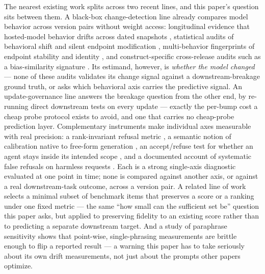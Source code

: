 \documentclass[11pt]{article}
\begin{document}
The nearest existing work splits across two recent lines, and this paper's question sits between them. A black-box change-detection line already compares model behavior across version pairs without weight access: longitudinal evidence that hosted-model behavior drifts across dated snapshots \citep{ChenDrift2307}, statistical audits of behavioral shift and silent endpoint modification \citep{AuditBehaviorShift2410,YouveChanged2504,RankUniformity2506,ModelEquality2410,LogProbTracking2512,ModelSubstitution2504}, multi-behavior fingerprints of endpoint stability and identity \citep{BehavioralFingerprints2603}, and construct-specific cross-release audits such as a bias-similarity signature \citep{BiasSimBSM2607}. Its estimand, however, is \emph{whether the model changed} --- none of these audits validates its change signal against a downstream-breakage ground truth, or asks which behavioral axis carries the predictive signal. An update-governance line answers the breakage question from the other end, by re-running direct downstream tests on every update \citep{TestBeforeDeploy2604,SkillDriftContract2605} --- exactly the per-bump cost a cheap probe protocol exists to avoid, and one that carries no cheap-probe prediction layer. Complementary instruments make individual axes measurable with real precision: a rank-invariant refusal metric \citep{RefusalIndex2607}, a semantic notion of calibration native to free-form generation \citep{BCalibration2607}, an accept/refuse test for whether an agent stays inside its intended scope \citep{OffTopicEval2607}, and a documented account of systematic false refusals on harmless requests \citep{ProSafePrune2607}. Each is a strong single-axis diagnostic evaluated at one point in time; none is compared against another axis, or against a real downstream-task outcome, across a version pair. A related line of work selects a minimal subset of benchmark items that preserves a score or a ranking under one fixed metric \citep{EssenceBench2607} --- the same ``how small can the sufficient set be'' question this paper asks, but applied to preserving fidelity to an existing score rather than to predicting a separate downstream target. And a study of paraphrase sensitivity shows that point-wise, single-phrasing measurements are brittle enough to flip a reported result \citep{TARE2607} --- a warning this paper has to take seriously about its own drift measurements, not just about the prompts other papers optimize.
\end{document}
